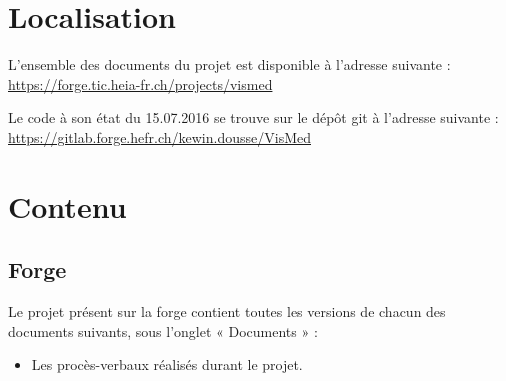 \section{Localisation}

	L’ensemble des documents du projet est disponible à l’adresse suivante :
	\url{https://forge.tic.heia-fr.ch/projects/vismed}

	Le code à son état du 15.07.2016 se trouve sur le dépôt git à l’adresse suivante :
	\url{https://gitlab.forge.hefr.ch/kewin.dousse/VisMed}

\section{Contenu}

	\subsection{Forge}

	Le projet présent sur la forge contient toutes les versions de chacun des documents suivants, sous l’onglet « Documents » :
	\begin{itemize}
		\item Les procès-verbaux réalisés durant le projet.
	\end{itemize}
